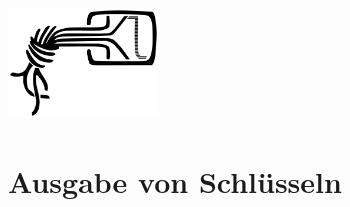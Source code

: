 \documentclass[ngerman,a4paper]{scrartcl}
\begin{document}
\begin{floatingfigure}{0.35\textwidth}
    \vspace{1cm}
    \includegraphics[viewport=0 0 744 541, width=4cm]{../korrespondenz/logo-schwarz.pdf}
\end{floatingfigure}

\section*{Ausgabe von Schlüsseln}
\end{document}
